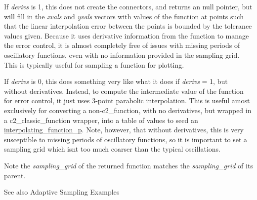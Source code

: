 If {\itshape derivs} is 1, this does not create the connectors, and returns an null pointer, but will fill in the {\itshape xvals} and {\itshape yvals} vectors with values of the function at points such that the linear interpolation error between the points is bounded by the tolerance values given. Because it uses derivative information from the function to manage the error control, it is almost completely free of issues with missing periods of oscillatory functions, even with no information provided in the sampling grid. This is typically useful for sampling a function for plotting.

If {\itshape derivs} is 0, this does something very like what it does if {\itshape derivs} = 1, but without derivatives. Instead, to compute the intermediate value of the function for error control, it just uses 3-\/point parabolic interpolation. This is useful amost exclusively for converting a non-\/c2\+\_\+function, with no derivatives, but wrapped in a c2\+\_\+classic\+\_\+function wrapper, into a table of values to seed an \hyperlink{classinterpolating__function__p}{interpolating\+\_\+function\+\_\+p}. Note, however, that without derivatives, this is very susceptible to missing periods of oscillatory functions, so it is important to set a sampling grid which isn\textquotesingle{}t too much coarser than the typical oscillations.

\begin{DoxyNote}{Note}
the {\itshape sampling\+\_\+grid} of the returned function matches the {\itshape sampling\+\_\+grid} of its parent. 
\end{DoxyNote}
\begin{DoxySeeAlso}{See also}
Adaptive Sampling Examples 
\end{DoxySeeAlso}

